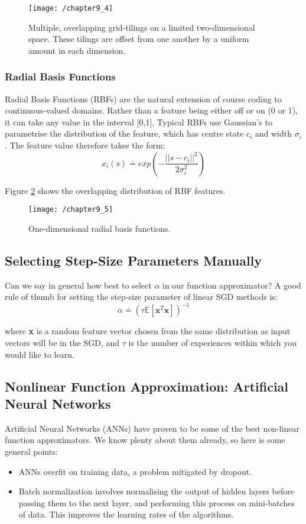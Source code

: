 \begin{figure}[h!]
	\centering
	\texttt{[image: /chapter9\_4]}
	\caption{Multiple, overlapping grid-tilings on a limited two-dimensional space. These tilings are offset from one another by a uniform amount in each dimension.}
	\label{fig: tile coding}
\end{figure}

\subsubsection{Radial Basis Functions}
Radial Basis Functions (RBFs) are the natural extension of course coding to continuous-valued domains. Rather than a feature being either off or on (0 or 1), it can take any value in the interval [0,1]. Typical RBFs use Gaussian's to parametrise the distribution of the feature, which has centre state $c_i$ and width $\sigma_i$. The feature value therefore takes the form:
\begin{equation}
x_i(s) \doteq exp \left(-\frac{||s - c_i||^2}{2 \sigma_i^2}\right)
\end{equation}

Figure \ref{fig: rbf} shows the overlapping distribution of RBF features.

\begin{figure}[h!]
	\centering
	\texttt{[image: /chapter9\_5]}
	\caption{One-dimensional radial basis functions.}
	\label{fig: rbf}
\end{figure}

\subsection{Selecting Step-Size Parameters Manually}
Can we say in general how best to select $\alpha$ in our function approximator? A good rule of thumb for setting the step-size parameter of linear SGD methods is:
\begin{equation}
	\alpha \doteq (\tau \mathbb{E}[\textbf{x}^T\textbf{x}])^{-1}
\end{equation}

where \textbf{x} is a random feature vector chosen from the same distribution as input vectors will be in the SGD, and $\tau$ is the number of experiences within which you would like to learn.

\subsection{Nonlinear Function Approximation: Artificial Neural Networks}
Artificial Neural Networks (ANNs) have proven to be some of the best non-linear function approximators. We know plenty about them already, so here is some general points:
\begin{itemize}
\item ANNs overfit on training data, a problem mitigated by dropout.
\item Batch normalization involves normalising the output of hidden layers before passing them to the next layer, and performing this process on mini-batches of data. This improves the learning rates of the algorithms.
\end{itemize}

